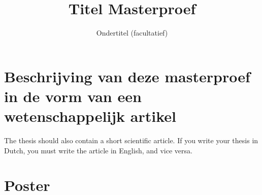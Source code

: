 \documentclass[11pt,a4paper]{report}
\title{Titel Masterproef}
\subtitle{Ondertitel (facultatief)}
\begin{document}
\preface

\printnoidxglossary[type=\acronymtype]%
\clearpage


%
%
%

\printbibliography


\appendix


\chapter{Beschrijving van deze masterproef in de vorm van een wetenschappelijk artikel}
The thesis should also contain a short scientific article. If you write your thesis in Dutch, you must write the article in English, and vice versa.
%

\chapter{Poster}
%

%
\end{document}
